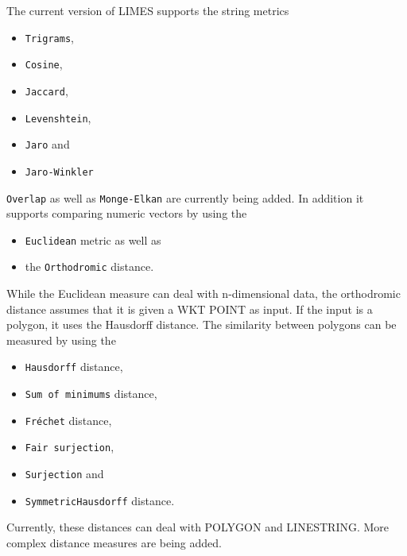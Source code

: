 \documentclass[a4paper, 11pt]{article}
\begin{document}
The current version of LIMES supports the string metrics
\begin{itemize}
\item \texttt{Trigrams},
\item \texttt{Cosine},
\item \texttt{Jaccard},
\item \texttt{Levenshtein},
\item \texttt{Jaro} and
\item \texttt{Jaro-Winkler}
\end{itemize}
\texttt{Overlap} as well as \texttt{Monge-Elkan} are currently being added.
In addition it supports comparing numeric vectors by using the
\begin{itemize}
\item \texttt{Euclidean} metric as well as
\item the \texttt{Orthodromic} distance.
\end{itemize}
While the Euclidean measure can deal with n-dimensional data, the orthodromic distance assumes that it is given a WKT POINT as input.
If the input is a polygon, it uses the Hausdorff distance.
The similarity between polygons can be measured by using the
\begin{itemize}
\item \texttt{Hausdorff} distance,
\item \texttt{Sum of minimums} distance,
\item \texttt{Fréchet} distance,
\item \texttt{Fair surjection},
\item \texttt{Surjection} and
\item \texttt{SymmetricHausdorff} distance.
\end{itemize}
Currently, these distances can deal with POLYGON and LINESTRING.
More complex distance measures are being added.
%
\end{document}
